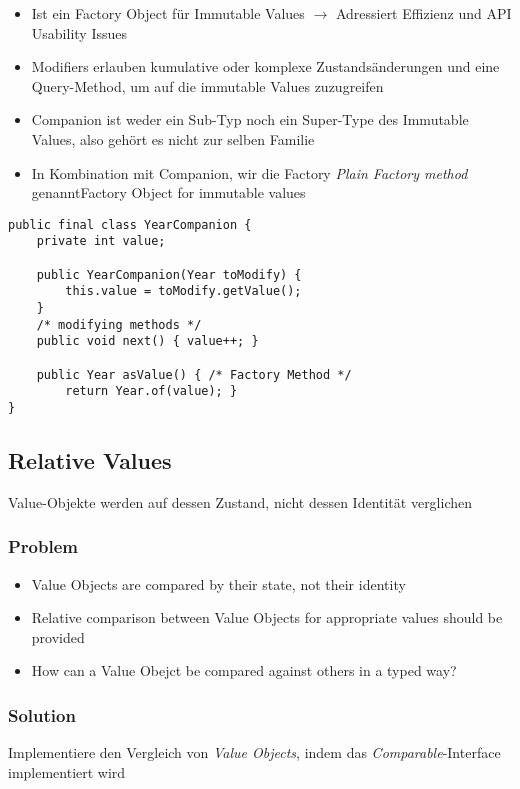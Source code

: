 \begin{itemize}
    \item Ist ein Factory Object für Immutable Values $\rightarrow$ Adressiert Effizienz und API Usability Issues
    \item Modifiers erlauben kumulative oder komplexe Zustandsänderungen und eine Query-Method, um auf die immutable Values zuzugreifen
    \item Companion ist weder ein Sub-Typ noch ein Super-Type des Immutable Values, also gehört es nicht zur selben Familie
    \item In Kombination mit Companion, wir die Factory \textit{Plain Factory method} genanntFactory Object for immutable values
\end{itemize}
\begin{lstlisting}
public final class YearCompanion {
    private int value;

    public YearCompanion(Year toModify) {
        this.value = toModify.getValue();
    }
    /* modifying methods */
    public void next() { value++; }

    public Year asValue() { /* Factory Method */
        return Year.of(value); }
}
\end{lstlisting}

\subsection{Relative Values}

Value-Objekte werden auf dessen Zustand, nicht dessen Identität verglichen

\subsubsection{Problem}
\begin{itemize}
    \item Value Objects are compared by their state, not their identity
    \item Relative comparison between Value Objects for appropriate values should be provided
    \item How can a Value Obejct be compared against others in a typed way?
\end{itemize}
\subsubsection{Solution}
Implementiere den Vergleich von \textit{Value Objects}, indem das \textit{Comparable}-Interface implementiert wird

